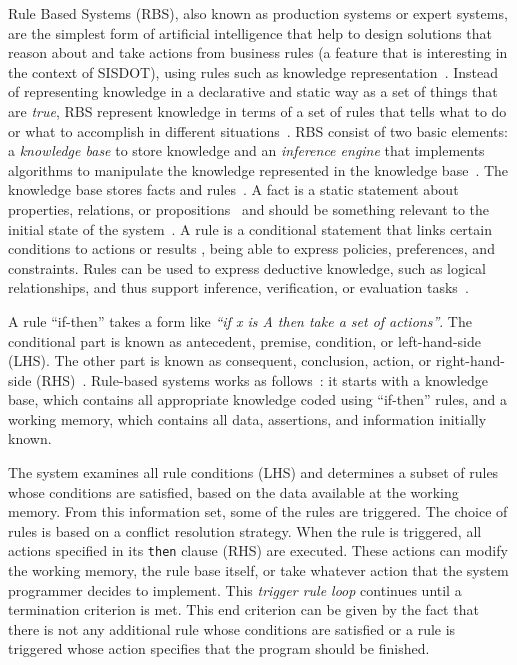 Rule Based Systems (RBS), also known as production systems or expert systems, are the simplest form of artificial intelligence that help to design solutions that reason about and take actions from business rules (a feature that is interesting in the context of SISDOT), using rules such as knowledge representation~\cite{grosan2011}. Instead of representing knowledge in a declarative and static way as a set of things that are \emph{true}, RBS represent knowledge in terms of a set of rules that tells what to do or what to accomplish in different situations~\cite{grosan2011}. RBS consist of two basic elements: a \emph{knowledge base} to store knowledge and an \emph{inference engine} that implements  algorithms to manipulate the knowledge represented in the knowledge base~\cite{grosan2011,DBLP:books/daglib/0070547,gallacher1989}. The knowledge base stores facts and rules~\cite{DBLP:journals/cacm/Hayes-Roth85}. A fact is a static statement about properties, relations, or propositions~\cite{DBLP:journals/cacm/Hayes-Roth85} and should be something relevant to the initial state of the system~\cite{grosan2011}. A rule is a conditional statement that links certain conditions to actions or results \cite{abraham2005}, being able to express policies, preferences, and constraints. Rules can be used to express deductive knowledge, such as logical relationships, and thus support inference, verification, or evaluation tasks~\cite{DBLP:journals/cacm/Hayes-Roth85}.

A rule ``if-then'' takes a form like \emph{``if x is A then take a set of actions''}. The conditional part is known as antecedent, premise, condition, or left-hand-side (LHS). The other part is known as consequent, conclusion, action, or right-hand-side (RHS)~\cite{grosan2011,abraham2005}. Rule-based systems works as follows~\cite{grosan2011}: it starts with a knowledge base, which contains all appropriate knowledge coded using ``if-then'' rules, and a working memory, which contains all data, assertions, and information initially known. 

The system examines all rule conditions (LHS) and determines a subset of rules whose conditions are satisfied, based on the data available at the working memory. From this information set, some of the rules are triggered. The choice of rules is based on a conflict resolution strategy. When the rule is triggered, all actions specified in its \texttt{then} clause (RHS) are executed. These actions can modify the working memory, the rule base itself, or take whatever action that the system programmer decides to implement. This \emph{trigger rule loop} continues until a termination criterion is met. This end criterion can be given by the fact that there is not any additional rule whose conditions are satisfied or a rule is triggered whose action specifies that the program should be finished.

